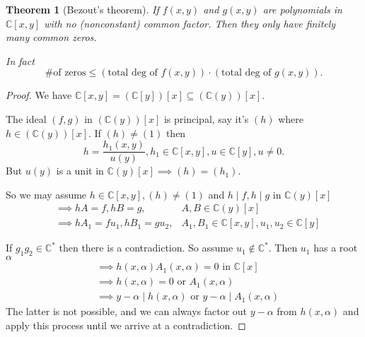 \documentclass{article}
\newcommand{\C}{\mathbb{C}}
\newtheorem*{theorem}{Theorem}
\theoremstyle{definition}
\theoremstyle{remark}
\begin{document}
\begin{theorem}[Bezout's theorem]
    If $f(x, y)$ and $g(x, y)$ are polynomials in $\C[x, y]$ with no (nonconstant) common factor. Then they only have finitely many common zeros.

    In fact \[\# \text{of zeros} \leq (\text{total deg of } f(x, y)) \cdot (\text{total deg of } g(x, y)).\]
\end{theorem}
\begin{proof}
    We have $\C[x, y] = (\C[y])[x] \subseteq (\C(y))[x]$.\

    The ideal $(f, g)$ in $(\C(y))[x]$ is principal, say it's $(h)$ where $h \in (\C(y))[x]$. If $(h) \neq (1)$ then \[h = \frac{h_1(x, y)}{u(y)}, h_1 \in \C[x, y], u \in \C[y], u \neq 0.\]
    But $u(y)$ is a unit in $\C(y)[x] \implies (h) = (h_1)$.

    So we may assume $h \in \C[x, y], (h) \neq (1)$ and $h \mid f, h \mid g$ in $\C(y)[x]$
    \begin{align*}
        & \implies hA = f, hB = g, & A, B \in \C(y)[x] \\
        & \implies hA_1 = fu_1, hB_1 = gu_2, & A_1, B_1 \in \C[x, y], u_1, u_2 \in \C[y]
    \end{align*}

    If $g_1g_2 \in \C^*$ then there is a contradiction. So assume $u_1 \notin \C^*$. Then $u_1$ has a root $\alpha$
    \begin{align*}
        & \implies h(x, \alpha)A_1(x, \alpha) = 0 \text{ in } \C[x] \\
        & \implies h(x, \alpha) = 0 \text{ or } A_1(x, \alpha) \\
        & \implies y - \alpha \mid h(x, \alpha) \text{ or } y - \alpha \mid A_1(x, \alpha) 
    \end{align*}
    The latter is not possible, and we can always factor out $y - \alpha$ from $h(x, \alpha)$ and apply this process until we arrive at a contradiction.
\end{proof}
\end{document}
